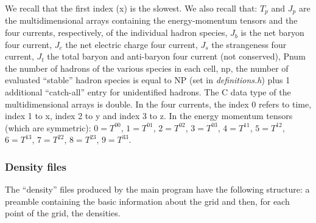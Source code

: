 \documentclass[12pt, a4paper]{article}
\begin{document}
We recall that the first index (x) is the slowest. We also recall that: $T_p$ and $J_p$ are the multidimensional arrays containing the energy-momentum tensors and the four currents, respectively, of the individual hadron species, $J_b$ is the net baryon four current, $J_c$ the net electric charge four current, $J_s$ the strangeness four current, $J_t$ the total baryon and anti-baryon four current (not conserved), Pnum the number of hadrons of the various species in each cell, np, the number of evaluated ``stable'' hadron species is equal to NP (set in \emph{definitions.h}) plus 1 additional ``catch-all'' entry for unidentified hadrons. The C data type of the multidimensional arrays is double. In the four currents, the index 0 refers to time, index 1 to x, index 2 to y and index 3 to z. In the energy momentum tensors (which are symmetric): $0=T^{00}$, $1=T^{01}$, $2=T^{02}$, $3=T^{03}$, $4=T^{11}$, $5=T^{12}$, $6=T^{13}$, $7=T^{22}$, $8=T^{23}$, $9=T^{33}$. 

\subsubsection{Density files}
The ``density'' files produced by the main program have the following structure: a preamble containing the basic information about the grid and then, for each point of the grid, the densities.\\
\end{document}
